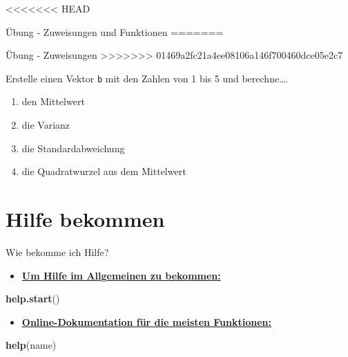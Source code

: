 \documentclass[ignorenonframetext,]{beamer}
\newenvironment{Shaded}{\begin{snugshade}}{\end{snugshade}}
\newcommand{\KeywordTok}[1]{\textcolor[rgb]{0.26,0.66,0.93}{\textbf{#1}}}
\newcommand{\NormalTok}[1]{\textcolor[rgb]{0.74,0.68,0.62}{#1}}
\providecommand{\tightlist}{%
  \setlength{\itemsep}{0pt}\setlength{\parskip}{0pt}}
\begin{document}
<<<<<<< HEAD
\begin{frame}[fragile]{Übung - Zuweisungen und Funktionen}
\protect\hypertarget{ubung---zuweisungen-und-funktionen}{}
=======
\begin{frame}[fragile]{Übung - Zuweisungen}
>>>>>>> 01469a2fc21a4ee08106a146f700460dce05e2c7

Erstelle einen Vektor \texttt{b} mit den Zahlen von 1 bis 5 und
berechne\ldots{}.

\begin{enumerate}
\item
  den Mittelwert
\item
  die Varianz
\item
  die Standardabweichung
\item
  die Quadratwurzel aus dem Mittelwert
\end{enumerate}

\end{frame}

\hypertarget{hilfe-bekommen}{%
\section{Hilfe bekommen}\label{hilfe-bekommen}}

\begin{frame}[fragile]{Wie bekomme ich Hilfe?}
\protect\hypertarget{wie-bekomme-ich-hilfe}{}

\begin{itemize}
\tightlist
\item
  \href{http://itfeature.com/tag/how-to-get-help-in-r}{\textbf{Um Hilfe
  im Allgemeinen zu bekommen:}}
\end{itemize}

\begin{Shaded}
\begin{Highlighting}[]
\KeywordTok{help.start}\NormalTok{()}
\end{Highlighting}
\end{Shaded}

\begin{itemize}
\tightlist
\item
  \href{https://www.r-project.org/help.html}{\textbf{Online-Dokumentation
  für die meisten Funktionen:}}
\end{itemize}

\begin{Shaded}
\begin{Highlighting}[]
\KeywordTok{help}\NormalTok{(name)}
\end{Highlighting}
\end{Shaded}


\end{frame}
\end{frame}
\end{document}
